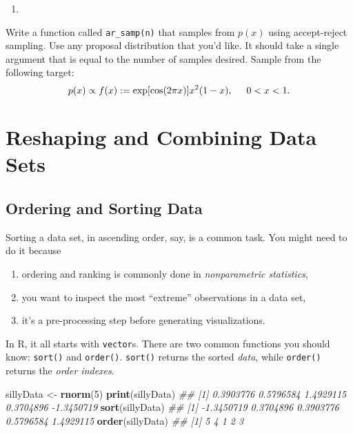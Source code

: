 \documentclass[12pt,krantz2]{krantz}
\makeatletter
\newenvironment{Shaded}{\begin{snugshade}}{\end{snugshade}}
\newcommand{\CommentTok}[1]{\textcolor[rgb]{0.37,0.37,0.37}{\textit{#1}}}
\newcommand{\DecValTok}[1]{\textcolor[rgb]{0.06,0.06,0.06}{#1}}
\newcommand{\KeywordTok}[1]{\textcolor[rgb]{0.27,0.27,0.27}{\textbf{#1}}}
\newcommand{\NormalTok}[1]{#1}
\newcommand{\StringTok}[1]{\textcolor[rgb]{0.5,0.5,0.5}{#1}}
\providecommand{\tightlist}{%
  \setlength{\itemsep}{0pt}\setlength{\parskip}{0pt}}
\newenvironment{kframe}{%
\medskip{}
\setlength{\fboxsep}{.8em}
 \def\at@end@of@kframe{}%
 \ifinner\ifhmode%
  \def\at@end@of@kframe{\end{minipage}}%
  \begin{minipage}{\columnwidth}%
 \fi\fi%
 \def\FrameCommand##1{\hskip\@totalleftmargin \hskip-\fboxsep
 \colorbox{shadecolor}{##1}\hskip-\fboxsep
     \hskip-\linewidth \hskip-\@totalleftmargin \hskip\columnwidth}%
 \MakeFramed {\advance\hsize-\width
   \@totalleftmargin\z@ \linewidth\hsize
   \@setminipage}}%
 {\par\unskip\endMakeFramed%
 \at@end@of@kframe}
\renewenvironment{Shaded}{\begin{kframe}}{\end{kframe}}
\makeatother
\begin{document}
\begin{enumerate}
\def\labelenumi{\arabic{enumi}.}
\setcounter{enumi}{2}
\item
\end{enumerate}

Write a function called \texttt{ar\_samp(n)} that samples from \(p(x)\) using accept-reject sampling. Use any proposal distribution that you'd like. It should take a single argument that is equal to the number of samples desired. Sample from the following target:
\begin{equation} 
p(x) \propto f(x) := \exp[\cos(2\pi x)] x^2(1-x), \hspace{5mm} 0 < x < 1.
\end{equation}

\hypertarget{reshaping-and-combining-data-sets}{%
\chapter{Reshaping and Combining Data Sets}\label{reshaping-and-combining-data-sets}}

\hypertarget{ordering-and-sorting-data}{%
\section{Ordering and Sorting Data}\label{ordering-and-sorting-data}}

Sorting a data set, in ascending order, say, is a common task. You might need to do it because

\begin{enumerate}
\def\labelenumi{\arabic{enumi}.}
\tightlist
\item
  ordering and ranking is commonly done in \emph{nonparametric statistics},
\item
  you want to inspect the most ``extreme'' observations in a data set,
\item
  it's a pre-processing step before generating visualizations.
\end{enumerate}

In R, it all starts with \texttt{vector}s. There are two common functions you should know: \texttt{sort()} and \texttt{order()}. \texttt{sort()} returns the sorted \emph{data}, while \texttt{order()} returns the \emph{order indexes}.

\begin{Shaded}
\begin{Highlighting}[]
\NormalTok{sillyData <-}\StringTok{ }\KeywordTok{rnorm}\NormalTok{(}\DecValTok{5}\NormalTok{)}
\KeywordTok{print}\NormalTok{(sillyData)}
\CommentTok{## [1]  0.3903776  0.5796584  1.4929115  0.3704896 -1.3450719}
\KeywordTok{sort}\NormalTok{(sillyData)}
\CommentTok{## [1] -1.3450719  0.3704896  0.3903776  0.5796584  1.4929115}
\KeywordTok{order}\NormalTok{(sillyData)}
\CommentTok{## [1] 5 4 1 2 3}
\end{Highlighting}
\end{Shaded}
\end{document}
